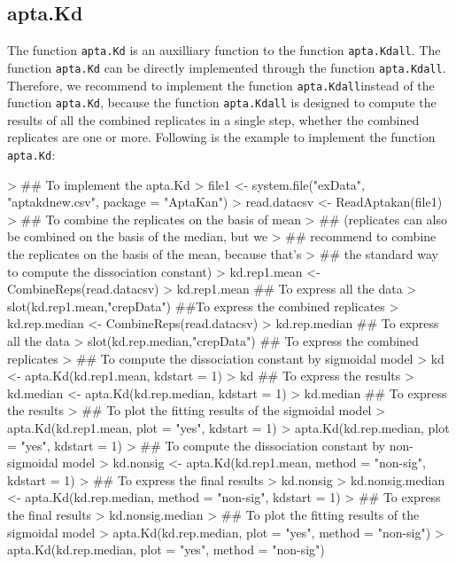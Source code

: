 \documentclass[11pt]{article}
\newcommand{\code}[1]{{\tt #1}}
\begin{document}
\subsection{apta.Kd}
The function \code{apta.Kd} is an auxilliary function to the function \code{apta.Kdall}. The function
\code{apta.Kd} can be directly implemented through the function \code{apta.Kdall}. Therefore, we recommend to implement the function \code{apta.Kdall}instead of the function \code{apta.Kd}, because the function \code{apta.Kdall} is designed to compute the results of all the combined replicates in a single step, whether the combined replicates are one or more. Following is the example to implement the function \code{apta.Kd}:

\begin{Schunk}
\begin{Sinput}
> ## To implement the apta.Kd
> file1 <- system.file("exData", "aptakdnew.csv", package = "AptaKan")
> read.datacsv <- ReadAptakan(file1)
> ## To combine the replicates on the basis of mean
> ## (replicates can also be combined on the basis of the median, but we
> ## recommend to combine the replicates on the basis of the mean, because that's
> ## the standard way to compute the dissociation constant)
> kd.rep1.mean <- CombineReps(read.datacsv)
> kd.rep1.mean ## To express all the data
> slot(kd.rep1.mean,"crepData")  ##To express the combined replicates
> kd.rep.median <- CombineReps(read.datacsv)
> kd.rep.median ## To express all the data
> slot(kd.rep.median,"crepData") ## To express the combined replicates
> ## To compute the dissociation constant by sigmoidal model
> kd <- apta.Kd(kd.rep1.mean, kdstart = 1)
> kd ## To express the results
> kd.median <- apta.Kd(kd.rep.median, kdstart = 1)
> kd.median ## To express the results
> ## To plot the fitting results of the sigmoidal model
> apta.Kd(kd.rep1.mean, plot = "yes", kdstart = 1)
> apta.Kd(kd.rep.median, plot = "yes", kdstart = 1)
> ## To compute the dissociation constant by non-sigmoidal model
> kd.nonsig <- apta.Kd(kd.rep1.mean, method = "non-sig", kdstart = 1)
> ## To express the final results
> kd.nonsig
> kd.nonsig.median <- apta.Kd(kd.rep.median, method = "non-sig", kdstart = 1)
> ## To express the final results
> kd.nonsig.median
> ## To plot the fitting results of the sigmoidal model
> apta.Kd(kd.rep.median, plot = "yes", method = "non-sig")
> apta.Kd(kd.rep.median, plot = "yes", method = "non-sig")
\end{Sinput}
\end{Schunk}
\end{document}
